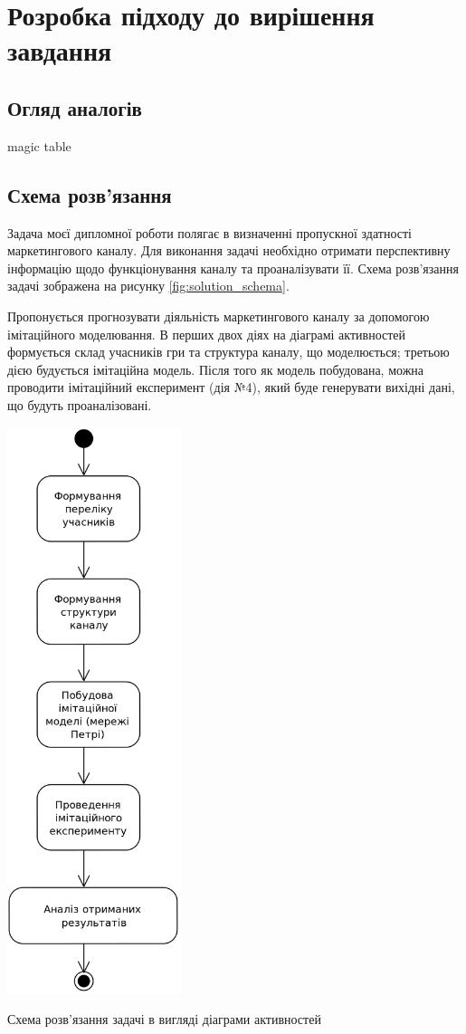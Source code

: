 \section{Розробка підходу до вирішення завдання}

\subsection{Огляд аналогів}
magic table

\subsection{Схема розв’язання}
Задача моєї дипломної роботи полягає в визначенні пропускної здатності маркетингового каналу. Для виконання задачі необхідно отримати перспективну інформацію щодо функціонування каналу та проаналізувати її. Схема розв’язання задачі зображена на рисунку \ref{fig:solution_schema}.

Пропонується прогнозувати діяльність маркетингового каналу за допомогою імітаційного моделювання. В перших двох діях на діаграмі активностей формується склад учасників гри та структура каналу, що моделюється; третьою дією будується імітаційна модель. Після того як модель побудована, можна проводити імітаційний експеримент (дія №4), який буде генерувати вихідні дані, що будуть проаналізовані.

            \begin{stdfigure}
                \includegraphics[width=2in]{images/uml_act_solution_schema.png}
                \caption{Схема розв’язання задачі в вигляді діаграми активностей}
                \label{fig:solution_schema}
            \end{stdfigure}   
